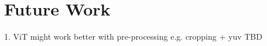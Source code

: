 \chapter{Future Work}
1. ViT might work better with pre-processing e.g. cropping + yuv TBD










